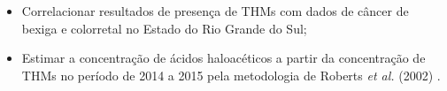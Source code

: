 \begin{itemize}
 \item Correlacionar resultados de presença de THMs com dados de câncer de bexiga e colorretal no Estado do Rio Grande do Sul;
 
 \item Estimar a concentração de ácidos haloacéticos a partir da concentração de THMs no período de 2014 a 2015 pela metodologia de Roberts \textit{et al.} (2002) \cite{roberts2002}.

\end{itemize}










